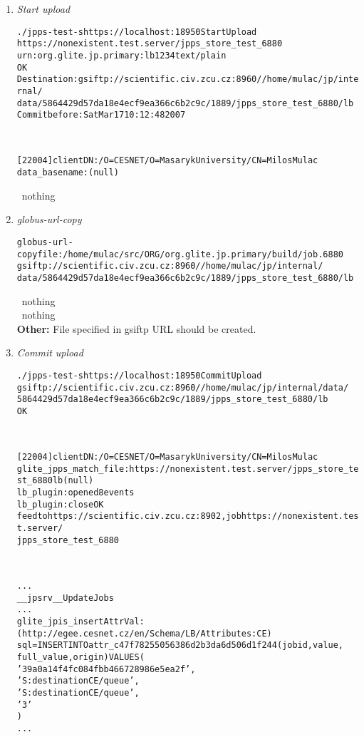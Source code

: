 \begin{enumerate}
 \item \emph{Start upload}
  \begin{alltt}
	./jpps-test -s https://localhost:18950 StartUpload 
	https://nonexistent.test.server/jpps_store_test_6880 
	urn:org.glite.jp.primary:lb 1234 text/plain
	OK
	Destination: gsiftp://scientific.civ.zcu.cz:8960//home/mulac/jp/internal/
	data/5864429d57da18e4ecf9ea366c6b2c9c/1889/jpps_store_test_6880/lb
	Commit before: Sat Mar 17 10:12:48 2007
  \end{alltt}
  \jpps\
  \begin{alltt}
	[22004] client DN: /O=CESNET/O=Masaryk University/CN=Milos Mulac
	data_basename: (null)
  \end{alltt}
  \jpis\
	nothing
 \item \emph{globus-url-copy}
  \begin{alltt}
	globus-url-copy file:/home/mulac/src/ORG/org.glite.jp.primary/build/job.6880
	gsiftp://scientific.civ.zcu.cz:8960//home/mulac/jp/internal/
	data/5864429d57da18e4ecf9ea366c6b2c9c/1889/jpps_store_test_6880/lb
  \end{alltt}
  \jpps\
	nothing \\
  \jpis\
	nothing \\
  \noindent\textbf{Other:}
	File specified in gsiftp URL should be created.
 \item \emph{Commit upload}
  \begin{alltt}
	./jpps-test -s https://localhost:18950 CommitUpload 
	gsiftp://scientific.civ.zcu.cz:8960//home/mulac/jp/internal/data/
	5864429d57da18e4ecf9ea366c6b2c9c/1889/jpps_store_test_6880/lb
	OK
  \end{alltt}
  \jpps\
  \begin{alltt}
	[22004] client DN: /O=CESNET/O=Masaryk University/CN=Milos Mulac
	glite_jpps_match_file: https://nonexistent.test.server/jpps_store_test_6880 lb (null)
	lb_plugin: opened 8 events
	lb_plugin: close OK
	feed to https://scientific.civ.zcu.cz:8902, job https://nonexistent.test.server/
	jpps_store_test_6880
  \end{alltt}
  \jpis\
  \begin{alltt}
	...
	__jpsrv__UpdateJobs
	...
	glite_jpis_insertAttrVal: (http://egee.cesnet.cz/en/Schema/LB/Attributes:CE) 
	sql=INSERT INTO attr_c47f78255056386d2b3da6d506d1f244 (jobid, value, 
	full_value, origin) VALUES (
        '39a0a14f4fc084fbb466728986e5ea2f',
        'S:destination CE/queue',
        'S:destination CE/queue',
        '3'
	)
	...
  \end{alltt}
 \end{enumerate}

